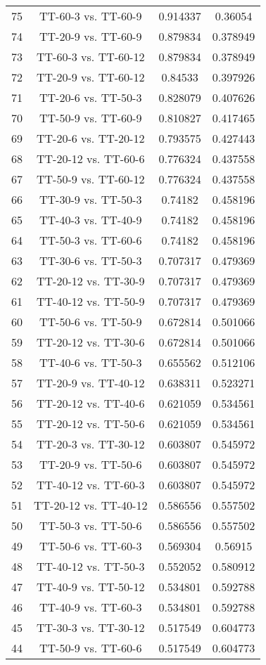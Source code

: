\documentclass[a4paper,10pt]{article}
\begin{document}
\begin{landscape}
\begin{table}[!htp]
\begin{tabular}{cccc}
75&TT-60-3 vs. TT-60-9&0.914337&0.36054\\
74&TT-20-9 vs. TT-60-9&0.879834&0.378949\\
73&TT-60-3 vs. TT-60-12&0.879834&0.378949\\
72&TT-20-9 vs. TT-60-12&0.84533&0.397926\\
71&TT-20-6 vs. TT-50-3&0.828079&0.407626\\
70&TT-50-9 vs. TT-60-9&0.810827&0.417465\\
69&TT-20-6 vs. TT-20-12&0.793575&0.427443\\
68&TT-20-12 vs. TT-60-6&0.776324&0.437558\\
67&TT-50-9 vs. TT-60-12&0.776324&0.437558\\
66&TT-30-9 vs. TT-50-3&0.74182&0.458196\\
65&TT-40-3 vs. TT-40-9&0.74182&0.458196\\
64&TT-50-3 vs. TT-60-6&0.74182&0.458196\\
63&TT-30-6 vs. TT-50-3&0.707317&0.479369\\
62&TT-20-12 vs. TT-30-9&0.707317&0.479369\\
61&TT-40-12 vs. TT-50-9&0.707317&0.479369\\
60&TT-50-6 vs. TT-50-9&0.672814&0.501066\\
59&TT-20-12 vs. TT-30-6&0.672814&0.501066\\
58&TT-40-6 vs. TT-50-3&0.655562&0.512106\\
57&TT-20-9 vs. TT-40-12&0.638311&0.523271\\
56&TT-20-12 vs. TT-40-6&0.621059&0.534561\\
55&TT-20-12 vs. TT-50-6&0.621059&0.534561\\
54&TT-20-3 vs. TT-30-12&0.603807&0.545972\\
53&TT-20-9 vs. TT-50-6&0.603807&0.545972\\
52&TT-40-12 vs. TT-60-3&0.603807&0.545972\\
51&TT-20-12 vs. TT-40-12&0.586556&0.557502\\
50&TT-50-3 vs. TT-50-6&0.586556&0.557502\\
49&TT-50-6 vs. TT-60-3&0.569304&0.56915\\
48&TT-40-12 vs. TT-50-3&0.552052&0.580912\\
47&TT-40-9 vs. TT-50-12&0.534801&0.592788\\
46&TT-40-9 vs. TT-60-3&0.534801&0.592788\\
45&TT-30-3 vs. TT-30-12&0.517549&0.604773\\
44&TT-50-9 vs. TT-60-6&0.517549&0.604773\\

\end{tabular}
\end{table}
\end{landscape}
\end{document}
